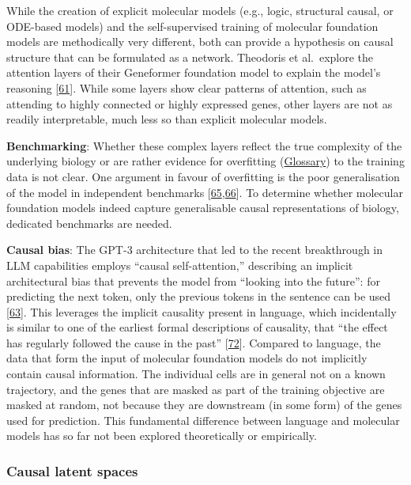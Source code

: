 While the creation of explicit molecular models (e.g., logic, structural causal, or ODE-based models) and the self-supervised training of molecular foundation models are methodically very different, both can provide a hypothesis on causal structure that can be formulated as a network.
Theodoris et al.~explore the attention layers of their Geneformer foundation model to explain the model's reasoning {[}\protect\hyperlink{ref-VmzWBJUJ}{61}{]}.
While some layers show clear patterns of attention, such as attending to highly connected or highly expressed genes, other layers are not as readily interpretable, much less so than explicit molecular models.

\textbf{Benchmarking}: Whether these complex layers reflect the true complexity of the underlying biology or are rather evidence for overfitting (\protect\hyperlink{overfitting}{Glossary}) to the training data is not clear.
One argument in favour of overfitting is the poor generalisation of the model in independent benchmarks {[}\protect\hyperlink{ref-WEYqVcYG}{65},\protect\hyperlink{ref-OFczH7ba}{66}{]}.
To determine whether molecular foundation models indeed capture generalisable causal representations of biology, dedicated benchmarks are needed.

\textbf{Causal bias}: The GPT-3 architecture that led to the recent breakthrough in LLM capabilities employs ``causal self-attention,'' describing an implicit architectural bias that prevents the model from ``looking into the future'': for predicting the next token, only the previous tokens in the sentence can be used {[}\protect\hyperlink{ref-1DSO3BUly}{63}{]}.
This leverages the implicit causality present in language, which incidentally is similar to one of the earliest formal descriptions of causality, that ``the effect has regularly followed the cause in the past'' {[}\protect\hyperlink{ref-WmT8ZU5I}{72}{]}.
Compared to language, the data that form the input of molecular foundation models do not implicitly contain causal information.
The individual cells are in general not on a known trajectory, and the genes that are masked as part of the training objective are masked at random, not because they are downstream (in some form) of the genes used for prediction.
This fundamental difference between language and molecular models has so far not been explored theoretically or empirically.

\hypertarget{causal-latent-spaces}{%
\subsubsection{Causal latent spaces}\label{causal-latent-spaces}}

